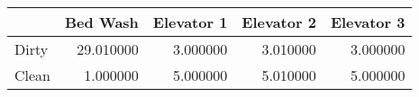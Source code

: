 \begin{tabular}{lrrrr}
\toprule
 & Bed Wash & Elevator 1 & Elevator 2 & Elevator 3 \\
\midrule
Dirty & 29.010000 & 3.000000 & 3.010000 & 3.000000 \\
Clean & 1.000000 & 5.000000 & 5.010000 & 5.000000 \\
\bottomrule
\end{tabular}
